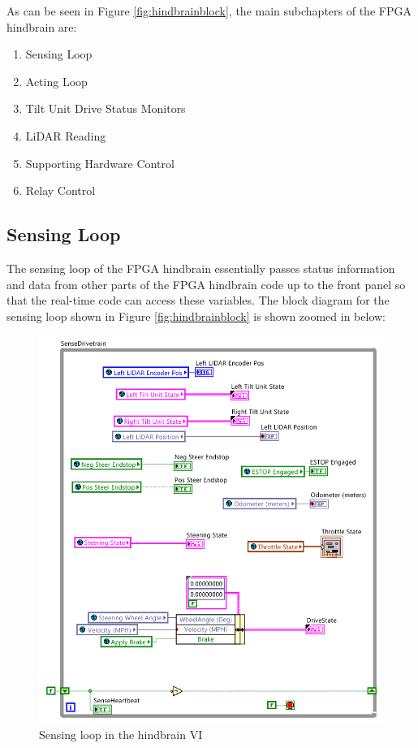 \newpage

\noindent As can be seen in Figure \ref{fig:hindbrainblock}, the main subchapters of the FPGA hindbrain are:

\begin{enumerate}
\item Sensing Loop
\item Acting Loop
\item Tilt Unit Drive Status Monitors
\item LiDAR Reading
\item Supporting Hardware Control
\item Relay Control
\end{enumerate}

\subsection{Sensing Loop}

The sensing loop of the FPGA hindbrain essentially passes status information and data from other parts of the FPGA hindbrain code up to the front panel so that the real-time code can access these variables. The block diagram for the sensing loop shown in Figure \ref{fig:hindbrainblock} is shown zoomed in below: 

\begin{figure}[h!]
\centering
\includegraphics[scale=1.5]{Photos/sensingloop.png}
\caption{Sensing loop in the hindbrain VI}
\label{fig:sensingloop}
\end{figure} 

